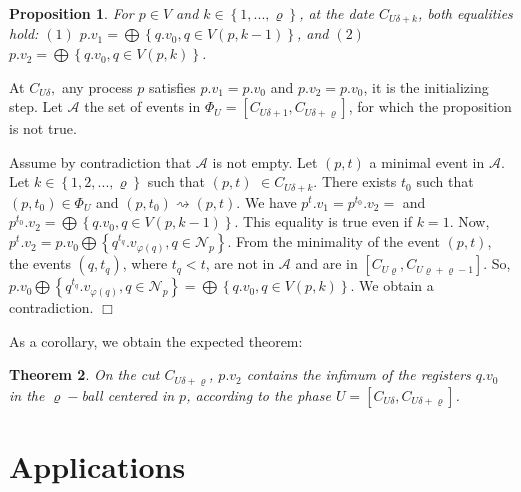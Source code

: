 \documentclass[11pt]{article}
\newenvironment{proof}{{\bf Proof. } }{{\hfill $\Box$}\vspace{.5pc}}
\newtheorem{theorem}{Theorem}[section]
\newtheorem{proposition}[theorem]{Proposition}
\begin{document}
\begin{proposition}
For $p \in V$ and $k \in \left\{ 1,...,\varrho \right\} $, at the date
$C_{U\delta  + k}$, both equalities hold:\newline
\noindent 
$(1)$ $p.v_{1}=\bigoplus \left\{ q.v_{0},q\in V\left( p,k -1\right) \right\}$,
and $(2)$ $p.v_{2}=\bigoplus \left\{ q.v_{0},q\in V\left( p,k \right)
\right\} 
$. 
\end{proposition}

\begin{proof}

At $C_{U\delta  },$ any process $p$ satisfies $p.v_{1}=p.v_{0}$
and $p.v_{2}=p.v_{0}$, it is the initializing step. Let $\mathcal{A}$ the set
of events in $\Phi_U=\left[ C_{U\delta  +1},C_{U\delta  +\varrho }\right] $, for
which the proposition is not true. 

Assume by contradiction that $\mathcal{A}$ is not
empty. Let $(p,t)$ a minimal event in $\mathcal{A}$. Let $k \in \left\{
1,2,...,\varrho \right\} $ such that $(p,t)$ $\in C_{U\delta  + k }$.
There exists $t_{0}$ such that $\left( p,t_{0}\right) \in \Phi_U $ and $\left( p,t_{0}\right) \rightsquigarrow (p,t)$. 
We have $p^{t}.v_{1}=p^{t_{0}}.v_{2}=$ and $p^{t_{0}}.v_{2}=\bigoplus
\left\{ q.v_{0},q\in V\left( p,k -1\right) \right\} $. This equality is
true even if $k =1$.
Now, $p^{t}.v_{2}=p.v_{0}\bigoplus \left\{ q^{t_{q}}.v_{\varphi \left(
q\right) },q\in \mathcal{N}_{p}\right\} $. From the minimality of the event $\left( p,t\right) $, the events $\left( q,t_{q}\right) $, where $t_{q}<t$, 
are not in $\mathcal{A}$ and are in $\left[ C_{U\varrho },C_{U\varrho +\varrho
-1}\right] $. 
So, $p.v_{0}\bigoplus \left\{ q^{t_{q}}.v_{\varphi \left(
q\right) },q\in \mathcal{N}_{p}\right\} =\bigoplus \left\{ q.v_{0},q\in
V\left( p,k \right) \right\} $. We obtain a contradiction. 
\end{proof}

As a corollary, we obtain the expected theorem:

\begin{theorem} On the cut $C_{U\delta  +\varrho } $, 
 $p.v_2$ contains the infimum of the registers $q.v_0 $ in the $\varrho-$ball centered in $p$, according to the phase $U=\left[ C_{U\delta  },C_{U\delta  +\varrho }\right] $.
\end{theorem}

\section{Applications}
\label{sec:distance_scheme}
\end{document}
